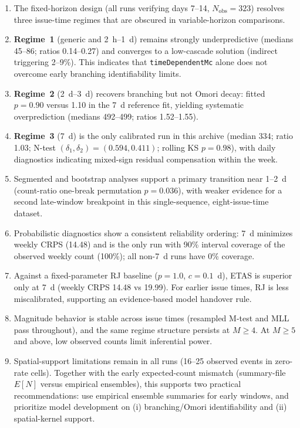 \documentclass[12pt,letterpaper]{article}
\begin{document}
\begin{enumerate}
    \item The fixed-horizon design (all runs verifying days 7--14,
    $N_{\mathrm{obs}}=323$) resolves three issue-time regimes that are obscured
    in variable-horizon comparisons.

    \item \textbf{Regime~1} (generic and 2~h--1~d) remains strongly
    underpredictive (medians 45--86; ratios 0.14--0.27) and converges to a
    low-cascade solution (indirect triggering 2--9\%). This indicates that
    \texttt{timeDependentMc} alone does not overcome early branching
    identifiability limits.

    \item \textbf{Regime~2} (2~d--3~d) recovers branching but not Omori decay:
    fitted $p=0.90$ versus 1.10 in the 7~d reference fit, yielding systematic
    overprediction (medians 492--499; ratios 1.52--1.55).

    \item \textbf{Regime~3} (7~d) is the only calibrated run in this archive
    (median 334; ratio 1.03; N-test $(\delta_1,\delta_2)=(0.594,0.411)$;
    rolling KS $p=0.98$), with daily diagnostics indicating mixed-sign residual
    compensation within the week.

    \item Segmented and bootstrap analyses support a primary transition near
    1--2~d (count-ratio one-break permutation $p=0.036$), with weaker evidence
    for a second late-window breakpoint in this single-sequence,
    eight-issue-time dataset.

    \item Probabilistic diagnostics show a consistent reliability ordering:
    7~d minimizes weekly CRPS (14.48) and is the only run with 90\% interval
    coverage of the observed weekly count (100\%); all non-7~d runs have 0\%
    coverage.

    \item Against a fixed-parameter RJ baseline ($p=1.0$, $c=0.1$~d), ETAS is
    superior only at 7~d (weekly CRPS 14.48 vs 19.99). For earlier issue times,
    RJ is less miscalibrated, supporting an evidence-based model handover rule.

    \item Magnitude behavior is stable across issue times (resampled M-test and
    MLL pass throughout), and the same regime structure persists at $M\geq4$.
    At $M\geq5$ and above, low observed counts limit inferential power.

    \item Spatial-support limitations remain in all runs (16--25 observed events
    in zero-rate cells). Together with the early expected-count mismatch
    (summary-file $E[N]$ versus empirical ensembles), this supports two practical
    recommendations: use empirical ensemble summaries for early windows, and
    prioritize model development on (i) branching/Omori identifiability and
    (ii) spatial-kernel support.
\end{enumerate}
\end{document}
